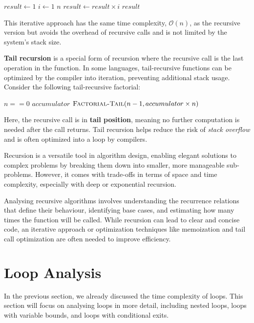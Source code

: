 \begin{codebox}
    \li $result \gets 1$
    \li \For $i \gets 1$ \To $n$ \Do
    \li     $result \gets result \times i$
        \End
    \li \Return $result$
\end{codebox}

This iterative approach has the same time complexity, $\mathcal{O}(n)$, as the recursive version but avoids the overhead of recursive calls and is not limited by the system's stack size.

\textbf{Tail recursion} is a special form of recursion where the recursive call is the last operation in the function. In some languages, tail-recursive functions can be optimized by the compiler into iteration, preventing additional stack usage. Consider the following tail-recursive factorial:

\begin{codebox}
    \li \If $n == 0$ \Then
    \li     \Return $accumulator$
        \End
    \li \Return $\proc{Factorial-Tail}(n-1, accumulator \times n)$
\end{codebox}

Here, the recursive call is in \textbf{tail position}, meaning no further computation is needed after the call returns. Tail recursion helps reduce the risk of \textit{stack overflow} and is often optimized into a loop by compilers.

Recursion is a versatile tool in algorithm design, enabling elegant solutions to complex problems by breaking them down into smaller, more manageable sub-problems. However, it comes with trade-offs in terms of space and time complexity, especially with deep or exponential recursion.

Analysing recursive algorithms involves understanding the recurrence relations that define their behaviour, identifying base cases, and estimating how many times the function will be called. While recursion can lead to clear and concise code, an iterative approach or optimization techniques like memoization and tail call optimization are often needed to improve efficiency.

\section{Loop Analysis}\label{sec:loop-analysis}
In the previous section, we already discussed the time complexity of loops. This section will focus on analysing loops in more detail, including nested loops, loops with variable bounds, and loops with conditional exits.

